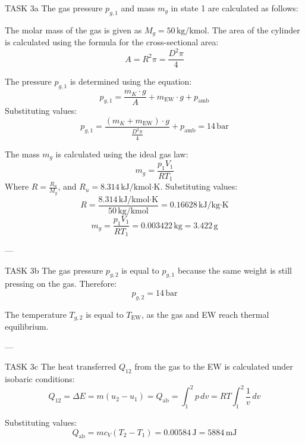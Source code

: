 TASK 3a  
The gas pressure \( p_{g,1} \) and mass \( m_g \) in state 1 are calculated as follows:  

The molar mass of the gas is given as \( M_g = 50 \, \text{kg/kmol} \). The area of the cylinder is calculated using the formula for the cross-sectional area:  
\[
A = R^2 \pi = \frac{D^2 \pi}{4}
\]  

The pressure \( p_{g,1} \) is determined using the equation:  
\[
p_{g,1} = \frac{m_K \cdot g}{A} + m_{\text{EW}} \cdot g + p_{\text{amb}}
\]  
Substituting values:  
\[
p_{g,1} = \frac{(m_K + m_{\text{EW}}) \cdot g}{\frac{D^2 \pi}{4}} + p_{\text{amb}} = 14 \, \text{bar}
\]  

The mass \( m_g \) is calculated using the ideal gas law:  
\[
m_g = \frac{p_1 V_1}{R T_1}
\]  
Where \( R = \frac{R_u}{M_g} \), and \( R_u = 8.314 \, \text{kJ/kmol·K} \). Substituting values:  
\[
R = \frac{8.314 \, \text{kJ/kmol·K}}{50 \, \text{kg/kmol}} = 0.16628 \, \text{kJ/kg·K}
\]  
\[
m_g = \frac{p_1 V_1}{R T_1} = 0.003422 \, \text{kg} = 3.422 \, \text{g}
\]  

---

TASK 3b  
The gas pressure \( p_{g,2} \) is equal to \( p_{g,1} \) because the same weight is still pressing on the gas. Therefore:  
\[
p_{g,2} = 14 \, \text{bar}
\]  

The temperature \( T_{g,2} \) is equal to \( T_{\text{EW}} \), as the gas and EW reach thermal equilibrium.  

---

TASK 3c  
The heat transferred \( Q_{12} \) from the gas to the EW is calculated under isobaric conditions:  
\[
Q_{12} = \Delta E = m(u_2 - u_1) = Q_{\text{ab}} = \int_1^2 p \, dv = R T \int_1^2 \frac{1}{v} \, dv
\]  

Substituting values:  
\[
Q_{\text{ab}} = m c_V (T_2 - T_1) = 0.00584 \, \text{J} = 5884 \, \text{mJ}
\]  

